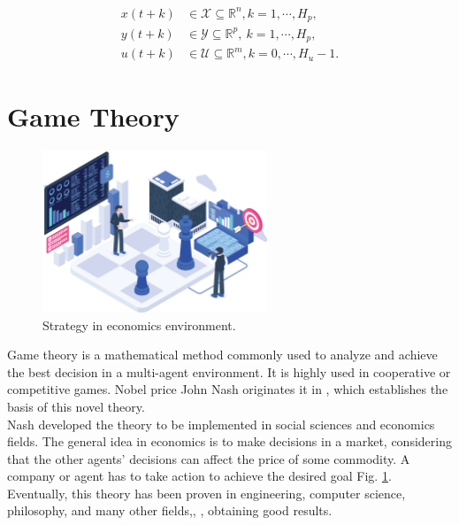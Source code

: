 \begin{align}
x(t+k) & \in \mathcal{X} \subseteq \mathbb{R}^n, k=1,\cdots,H_p, \\
y(t+k) & \in \mathcal{Y} \subseteq \mathbb{R}^p,\  k=1,\cdots,H_p, \\
u(t+k) & \in \mathcal{U} \subseteq \mathbb{R}^m, k=0,\cdots,H_u-1.
\end{align}


\section{Game Theory}

\begin{figure}[H]
\begin{center}
    \includegraphics[width=0.6\textwidth]{Kap2/Strategy.png}
    \caption{Strategy in economics environment.}
    \label{fig:game_theory}
\end{center}
\end{figure}

Game theory is a mathematical method commonly used to analyze and achieve the best decision in a multi-agent environment. It is highly used in cooperative or competitive games. Nobel price John Nash originates it in \cite{nash_novel, 1t_fe}, which establishes the basis of this novel theory.
\\

Nash developed the theory to be implemented in social sciences and economics fields. The general idea in economics is to make decisions in a market, considering that the other agents' decisions can affect the price of some commodity. A company or agent has to take action to achieve the desired goal Fig. \ref{fig:game_theory}. Eventually, this theory has been proven in engineering, computer science, philosophy, and many other fields,\cite{33t_GameTheory2, 2t_fe_cooper_game}, \cite{46t_inproceedings}, obtaining good results. 
\\

